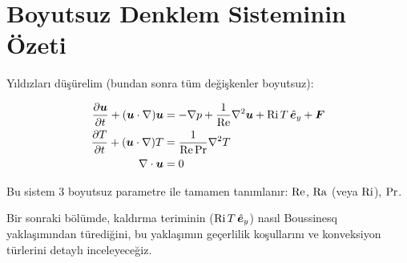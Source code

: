 \section{Boyutsuz Denklem Sisteminin Özeti}
\label{sec:boyutsuz_ozet}

Yıldızları düşürelim (bundan sonra tüm değişkenler boyutsuz):

\begin{subequations}
\label{eq:nondim_system}
\begin{align}
    \frac{\partial \bm{u}}{\partial t} + (\bm{u}\cdot\nabla)\bm{u} &= -\nabla p + \frac{1}{\mathrm{Re}}\nabla^2\bm{u} + \mathrm{Ri}\,T\,\hat{\bm{e}}_y + \bm{F} \label{eq:nondim_mom_final} \\
    \frac{\partial T}{\partial t} + (\bm{u}\cdot\nabla)T &= \frac{1}{\mathrm{Re}\,\mathrm{Pr}}\nabla^2 T \label{eq:nondim_ene_final} \\
    \nabla \cdot\bm{u} &= 0 \label{eq:nondim_cont_final}
\end{align}
\end{subequations}

Bu sistem 3 boyutsuz parametre ile tamamen tanımlanır: $\mathrm{Re}$, $\mathrm{Ra}$ (veya $\mathrm{Ri}$), $\mathrm{Pr}$.

Bir sonraki bölümde, kaldırma teriminin ($\mathrm{Ri}\,T\,\hat{\bm{e}}_y$) nasıl Boussinesq yaklaşımından türediğini, bu yaklaşımın geçerlilik koşullarını ve konveksiyon türlerini detaylı inceleyeceğiz.
